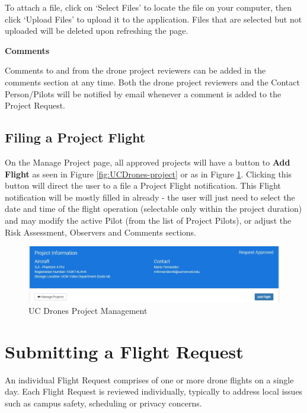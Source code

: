 \documentclass[
  12pt,
]{book}
\begin{document}
To attach a file, click on `Select Files' to locate the file on your computer, then click `Upload Files' to upload it to the application. Files that are selected but not uploaded will be deleted upon refreshing the page.

\textbf{Comments}

Comments to and from the drone project reviewers can be added in the comments section at any time. Both the drone project reviewers and the Contact Person/Pilots will be notified by email whenever a comment is added to the Project Request.

\subsection{Filing a Project Flight}\label{filing-a-project-flight}

On the Manage Project page, all approved projects will have a button to \textbf{Add Flight} as seen in Figure \ref{fig:UCDrones-project} or as in Figure \ref{fig:UCDrones-project-flight-2}. Clicking this button will direct the user to a file a Project Flight notification. This Flight notification will be mostly filled in already - the user will just need to select the date and time of the flight operation (selectable only within the project duration) and may modify the active Pilot (from the list of Project Pilots), or adjust the Risk Assessment, Observers and Comments sections.

\begin{figure}

{\centering \includegraphics[width=0.85\linewidth]{images/UCDrones_project_addflight} 

}

\caption{UC Drones Project Management}\label{fig:UCDrones-project-flight-2}
\end{figure}

\section{Submitting a Flight Request}\label{submitting-a-flight-request}

An individual Flight Request comprises of one or more drone flights on a single day. Each Flight Request is reviewed individually, typically to address local issues such as campus safety, scheduling or privacy concerns.
\end{document}
